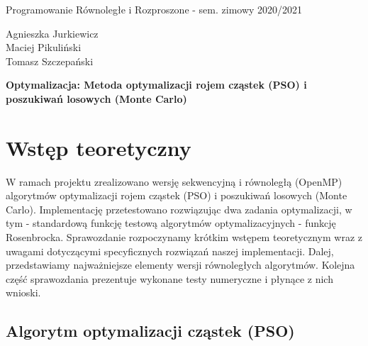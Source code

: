 \documentclass[11pt, a4paper, oneside]{article}
\begin{document}
\hspace*{-\parindent}%
\begin{minipage}{\textwidth}
  \begin{minipage}{.7\textwidth}
   \begin{flushleft}
	Programowanie Równoległe i Rozproszone - sem. zimowy 2020/2021
	\end{flushleft}
  \end{minipage}
  \begin{minipage}{.3\textwidth}
    \begin{flushright}
	Agnieszka Jurkiewicz \\
	Maciej Pikuliński \\
	Tomasz Szczepański
	\end{flushright}
  \end{minipage}%
\end{minipage}
\begin{center}
{\Large \textbf{Optymalizacja: Metoda optymalizacji rojem cząstek (PSO) i poszukiwań losowych (Monte Carlo)}}
\end{center}

\section{Wstęp teoretyczny}
 
W ramach projektu zrealizowano wersję sekwencyjną i równoległą (OpenMP) algorytmów optymalizacji rojem cząstek (PSO) i poszukiwań losowych (Monte Carlo). Implementację przetestowano rozwiązując dwa zadania optymalizacji, w tym - standardową funkcję testową algorytmów optymalizacyjnych - funkcję Rosenbrocka. Sprawozdanie rozpoczynamy krótkim wstępem teoretycznym wraz z uwagami dotyczącymi specyficznych rozwiązań naszej implementacji. Dalej, przedstawiamy najważniejsze elementy wersji równoległych algorytmów. Kolejna część sprawozdania prezentuje wykonane testy numeryczne i płynące z nich wnioski.

\subsection{Algorytm optymalizacji cząstek (PSO)} 
\end{document}
